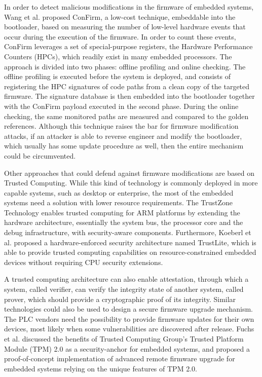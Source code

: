 In order to detect malicious modifications in the firmware of embedded systems, Wang et al. \cite{confirm} proposed ConFirm,
a low-cost technique, embeddable into the bootloader, based on measuring the number of low-level hardware events that occur during the execution of the firmware.
In order to count these events, ConFirm leverages a set of special-purpose registers, the Hardware Performance Counters (HPCs), which readily exist in many embedded processors.
The approach is divided into two phases: offline profiling and online checking. The offline profiling is executed before the system is deployed,
and consists of registering the HPC signatures of code paths from a clean copy of the targeted firmware. The signature database is then embedded into the bootloader
together with the ConFirm payload executed in the second phase. During the online checking, the same monitored paths are measured and compared to the golden references.
Although this technique raises the bar for firmware modification attacks, if an attacker is able to reverse engineer and modify the bootloader,
which usually has some update procedure as well, then the entire mechanism could be circumvented.

Other approaches that could defend against firmware modifications are based on Trusted Computing. While this kind of technology is commonly deployed
in more capable systems, such as desktop or enterprise, the most of the embedded systems need a solution with lower resource requirements.
The TrustZone Technology \cite{trustzone} enables trusted computing for ARM platforms by extending the hardware architecture,
essentially the system bus, the processor core and the debug infrastructure, with security-aware components.
Furthermore, Koeberl et al. \cite{trustlite} proposed a hardware-enforced security architecture named TrustLite, which is able to provide trusted computing capabilities
on resource-constrained embedded devices without requiring CPU security extensions.

A trusted computing architecture can also enable attestation, through which a system, called verifier, can verify the integrity state of another system, called prover,
which should provide a cryptographic proof of its integrity. Similar technologies could also be used to design a secure firmware upgrade mechanism.
The PLC vendors need the possibility to provide firmware updates for their own devices, most likely when some vulnerabilities are discovered after release.
Fuchs et al. \cite{tpm2} discussed the benefits of Trusted Computing Group’s Trusted Platform Module (TPM) 2.0 as a security-anchor for embedded systems,
and proposed a proof-of-concept implementation of advanced remote firmware upgrade for embedded systems relying on the unique features of TPM 2.0.


